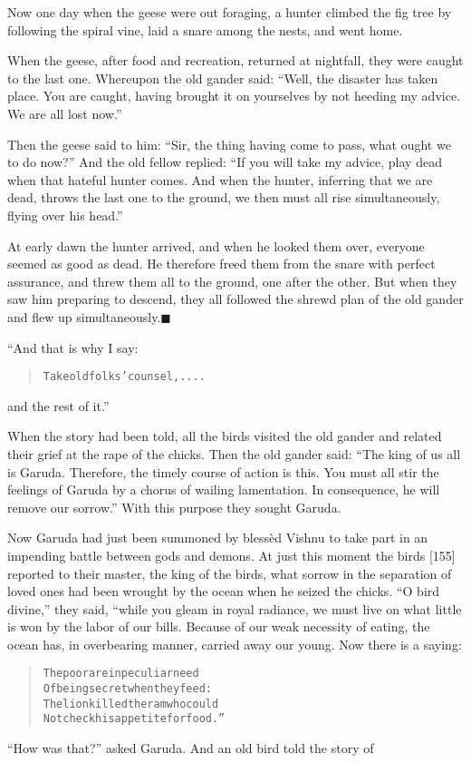 \documentclass[article, twoside, 14pt]{memoir}
\newcommand{\qed}{\hfill \ensuremath{\blacksquare}}
\renewenvironment{verbatim}{%
\begin{quote}%
\vskip -10pt%
\begin{alltt}\normalfont\large}{\end{alltt}%
\end{quote}%
\vskip -10pt
} %
\begin{document}
Now one day when the geese were out foraging, a hunter climbed the
fig tree by following the spiral vine, laid a snare among the
nests, and went home.

When the geese, after food and recreation, returned at nightfall,
they were caught to the last one. Whereupon the old gander said:
``Well, the disaster has taken place. You are caught, having brought it on yourselves by not heeding my advice. We are all lost now.''

Then the geese said to him:
``Sir, the thing having come to pass, what ought we to do now?''
And the old fellow replied:
``If you will take my advice, play dead when that hateful hunter comes. And when the hunter, inferring that we are dead, throws the last one to the ground, we then must all rise simultaneously, flying over his head.''

At early dawn the hunter arrived, and when he looked them over,
everyone seemed as good as dead. He therefore freed them from the
snare with perfect assurance, and threw them all to the ground, one
after the other. But when they saw him preparing to descend, they
all followed the shrewd plan of the old gander and flew up
simultaneously.\hyperref[s22]{\qed}

“And that is why I say:

\begin{verbatim}
Take old folks' counsel, ....
\end{verbatim}
and the rest of it.”

When the story had been told, all the birds visited the old gander
and related their grief at the rape of the chicks. Then the old
gander said:
``The king of us all is Garuda. Therefore, the timely course of action is this. You must all stir the feelings of Garuda by a chorus of wailing lamentation. In consequence, he will remove our sorrow.''
With this purpose they sought Garuda.

Now Garuda had just been summoned by blessèd Vishnu to take part in
an impending battle between gods and demons. At just this moment
the birds [155] reported to their master, the king of the birds,
what sorrow in the separation of loved ones had been wrought by the
ocean when he seized the chicks. ``O bird divine,'' they said,
“while you gleam in royal radiance, we must live on what little is
won by the labor of our bills. Because of our weak necessity of
eating, the ocean has, in overbearing manner, carried away our
young. Now there is a saying:

\begin{verbatim}
The poor are in peculiar need
Of being secret when they feed:
The lion killed the ram who could
Not check his appetite for food.”
\end{verbatim}
``How was that?'' asked Garuda. And an old bird told the story of
\end{document}
